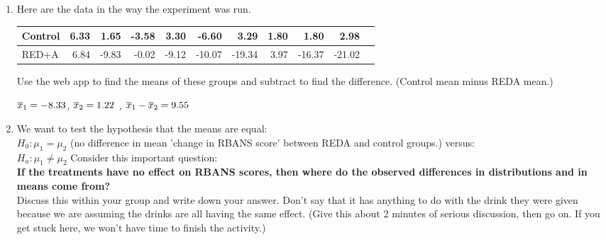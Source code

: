 \begin{enumerate}
   Shape
\begin{students}
    \vspace{1cm}    
\end{students}

\begin{key}
  {\it            RED+A seems most symmetric (boxplot), Cotrol
         has some outliers.
}
\end{key}


The researchers used a computer randomization to assign the 
subjects into the groups. We'll shuffle cards instead. 

\item Here are the data in the way the experiment was run.

  \begin{tabular}{l|rrrrrrrrrr} \hline
Control&6.33&1.65&-3.58&3.30&-6.60&3.29&1.80&1.80&2.98&\\ \hline
RED+A & 6.84&-9.83&-0.02&-9.12&-10.07&-19.34&3.97&-16.37&-21.02&\\ \hline
\end{tabular}

Use the web app to find the means of these groups and subtract to find
the difference.  (Control mean minus REDA mean.) 
\begin{students}
    \vspace{1cm}    
\end{students}

\begin{key}
  {\it   $\overline{x}_1 = -8.33$, $\overline{x}_2 = 1.22$ ,  $\overline{x}_1 -\overline{x}_2 = 9.55$ }
\end{key}


\item  
We want to test the hypothesis that the means are equal:\\
  $H_0: \mu_1 = \mu_2$  (no difference in mean 'change in RBANS score'
  between REDA and control groups.)  versus:\\
  $H_a:  \mu_1 \neq \mu_2$ \hfill Consider this important question:
  \\
{\bf \sf
If the treatments have no effect on RBANS scores, then where do the
observed differences in distributions and in means come from?
}\vspace*{.2cm} \\
   Discuss this within your group and write down your answer.
  Don't say that it has anything to do with the drink they were given
  because we are assuming the drinks are all having the same effect. 
  (Give this about 2 minutes of serious discussion, then go on.
   If you get stuck here, we  won't have time to finish the activity.)
\begin{students}
    \vspace{2cm}    
\end{students}


\end{enumerate}
